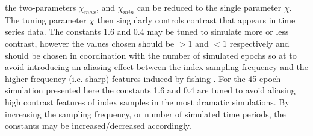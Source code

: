 the two-parameters $\chi_{max}$, and $\chi_{min}$ can be reduced to the single
parameter $\chi$. The tuning parameter $\chi$ then singularly controls contrast
that appears in time series data. The constants 1.6 and 0.4 may be tuned to 
simulate more or less contrast, however the values chosen should be $>1$ and $<1$ 
respectively and should be chosen in coordination with the number of simulated  
epochs so at to avoid introducing an aliasing effect between the index sampling 
frequency and the higher frequency (i.e. sharp) features induced by fishing 
\cite{shannon_communication_1998, mclean_nyquistovercoming_2005}. For 
the 45 epoch simulation presented here the constants 1.6 and 0.4 %
are tuned to avoid aliasing high contrast features of index samples in the 
most dramatic simulations. By increasing the sampling frequency, or number of 
simulated time periods, the constants may be increased/decreased accordingly. 


